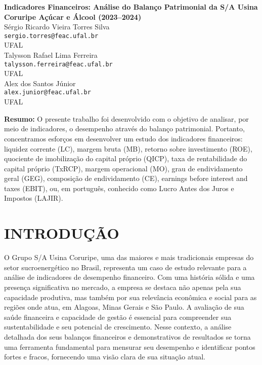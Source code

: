 \documentclass[1pt,a4paper]{article}
\begin{document}
	
	\begin{center}
		\LARGE \textbf{Indicadores Financeiros: Análise do Balanço Patrimonial da S/A Usina Coruripe Açúcar e Álcool (2023–2024)  
		 } \\[1cm]
		
		\large
		Sérgio Ricardo Vieira Torres Silva\\
		\texttt{sergio.torres@feac.ufal.br}\\
		UFAL\\[0.5cm]
		
		Talysson Rafael Lima Ferreira\\
		\texttt{talysson.ferreira@feac.ufal.br}\\
		UFAL\\[0.5cm]
		
		Alex dos Santos Júnior\\
		\texttt{alex.junior@feac.ufal.br}\\
		UFAL\\[0.5cm]
		
		
	\end{center}
	
	\vspace{1cm}
	
	\noindent \textbf{Resumo:} O presente trabalho foi desenvolvido com o objetivo de analisar, por meio de indicadores, o desempenho através do balanço patrimonial. Portanto, concentramos esforços em desenvolver um estudo dos indicadores financeiros: liquidez corrente (LC), margem bruta (MB), retorno sobre investimento (ROE), quociente de imobilização do capital próprio (QICP), taxa de rentabilidade do capital próprio (TxRCP), margem operacional (MO), grau de endividamento geral (GEG), composição de endividamento (CE), earnings before interest and taxes (EBIT), ou, em português, conhecido como Lucro Antes dos Juros e Impostos (LAJIR).
	
	\section{INTRODUÇÃO}
	\setlength{\parindent}{1.5cm}
	
	\hspace*{1.5cm} O Grupo S/A Usina Coruripe, uma das maiores e mais tradicionais empresas do setor sucroenergético no Brasil, representa um caso de estudo relevante para a análise de indicadores de desempenho financeiro. Com uma história sólida e uma presença significativa no mercado, a empresa se destaca não apenas pela sua capacidade produtiva, mas também por sua relevância econômica e social para as regiões onde atua, em Alagoas, Minas Gerais e São Paulo. A avaliação de sua saúde financeira e capacidade de gestão é essencial para compreender sua sustentabilidade e seu potencial de crescimento. Nesse contexto, a análise detalhada dos seus balanços financeiros e demonstrativos de resultados se torna uma ferramenta fundamental para mensurar seu desempenho e identificar pontos fortes e fracos, fornecendo uma visão clara de sua situação atual.
	
\end{document}
